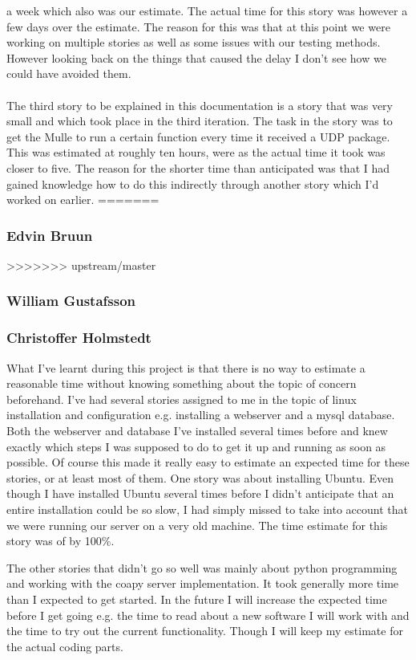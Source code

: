 a week  which also was our estimate. The actual time for this story was however a few days over the estimate. The reason for this was that at this point we were working on multiple stories as
well as some issues with our testing methods. However looking back on the things that caused the delay I don't see how we could have avoided them.
\\\\
The third story to be explained in this documentation is a story that was very small and which took place in the third iteration.
The task in the story was to get the Mulle to run a certain function every time it received a UDP package. This was estimated at roughly ten hours, 
were as the actual time it took was closer to five. The reason for the shorter time than anticipated was that I had gained knowledge how to do this 
indirectly through another story which I'd worked on earlier.
=======
\subsubsection{Edvin Bruun}
>>>>>>> upstream/master
\subsubsection{William Gustafsson}
\subsubsection{Christoffer Holmstedt}
What I've learnt during this project is that there is no way to estimate a reasonable time without knowing something about the topic of concern beforehand.
I've had several stories assigned to me in the topic of linux installation and configuration e.g. installing a webserver and a mysql database.
Both the webserver and database I've installed several times before and knew exactly which steps I was supposed to do to get it up and running as soon as possible.
Of course this made it really easy to estimate an expected time for these stories, or at least most of them.
One story was about installing Ubuntu.
Even though I have installed Ubuntu several times before I didn't anticipate that an entire installation could be so slow, I had simply missed to take into account that we were running our server on a very old machine.
The time estimate for this story was of by 100\%.

The other stories that didn't go so well was mainly about python programming and working with the coapy server implementation. 
It took generally more time than I expected to get started.
In the future I will increase the expected time before I get going e.g. the time to read about a new software I will work with and the time to try out the current functionality.
Though I will keep my estimate for the actual coding parts.

